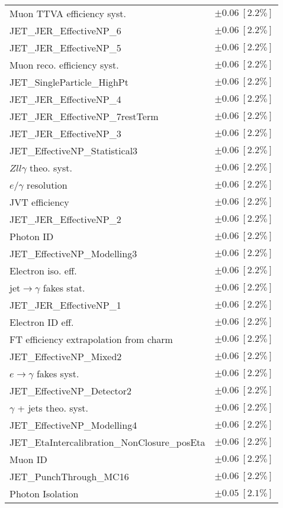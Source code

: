 \begin{tabular}{lr}
Muon TTVA efficiency syst. & $\pm 0.06\ [2.2\%]$ \\
JET\_JER\_EffectiveNP\_6 & $\pm 0.06\ [2.2\%]$ \\
JET\_JER\_EffectiveNP\_5 & $\pm 0.06\ [2.2\%]$ \\
Muon reco. efficiency syst. & $\pm 0.06\ [2.2\%]$ \\
JET\_SingleParticle\_HighPt & $\pm 0.06\ [2.2\%]$ \\
JET\_JER\_EffectiveNP\_4 & $\pm 0.06\ [2.2\%]$ \\
JET\_JER\_EffectiveNP\_7restTerm & $\pm 0.06\ [2.2\%]$ \\
JET\_JER\_EffectiveNP\_3 & $\pm 0.06\ [2.2\%]$ \\
JET\_EffectiveNP\_Statistical3 & $\pm 0.06\ [2.2\%]$ \\
$Zll\gamma$ theo. syst. & $\pm 0.06\ [2.2\%]$ \\
$e/\gamma$ resolution & $\pm 0.06\ [2.2\%]$ \\
JVT efficiency & $\pm 0.06\ [2.2\%]$ \\
JET\_JER\_EffectiveNP\_2 & $\pm 0.06\ [2.2\%]$ \\
Photon ID & $\pm 0.06\ [2.2\%]$ \\
JET\_EffectiveNP\_Modelling3 & $\pm 0.06\ [2.2\%]$ \\
Electron iso. eff. & $\pm 0.06\ [2.2\%]$ \\
jet$\to\gamma$ fakes stat. & $\pm 0.06\ [2.2\%]$ \\
JET\_JER\_EffectiveNP\_1 & $\pm 0.06\ [2.2\%]$ \\
Electron ID eff. & $\pm 0.06\ [2.2\%]$ \\
FT efficiency extrapolation from charm & $\pm 0.06\ [2.2\%]$ \\
JET\_EffectiveNP\_Mixed2 & $\pm 0.06\ [2.2\%]$ \\
$e\to\gamma$ fakes syst. & $\pm 0.06\ [2.2\%]$ \\
JET\_EffectiveNP\_Detector2 & $\pm 0.06\ [2.2\%]$ \\
$\gamma$ + jets theo. syst. & $\pm 0.06\ [2.2\%]$ \\
JET\_EffectiveNP\_Modelling4 & $\pm 0.06\ [2.2\%]$ \\
JET\_EtaIntercalibration\_NonClosure\_posEta & $\pm 0.06\ [2.2\%]$ \\
Muon ID & $\pm 0.06\ [2.2\%]$ \\
JET\_PunchThrough\_MC16 & $\pm 0.06\ [2.2\%]$ \\
Photon Isolation & $\pm 0.05\ [2.1\%]$ \\

\end{tabular}
